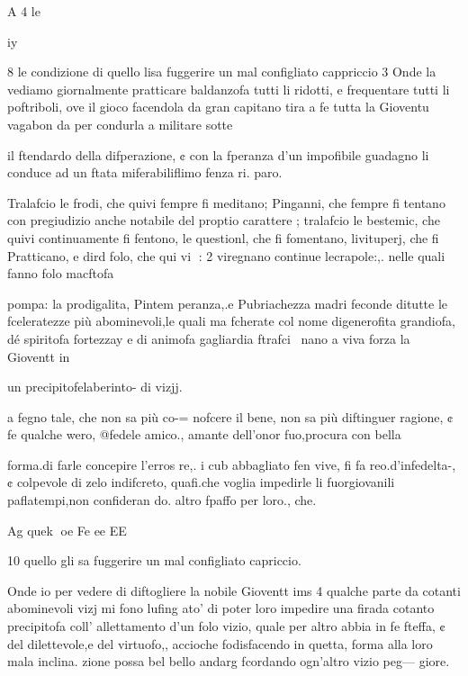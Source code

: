 \documentclass[11pt,a6paper]{article}
\begin{document}
A 4 le

iy

 

 

 

 
 

8
le condizione di quello lisa fuggerire un mal configliato cappriccio 3 Onde la vediamo giornalmente pratticare baldanzofa
tutti li ridotti, e frequentare
tutti li poftriboli, ove il gioco
facendola da gran capitano tira
a fe tutta la Gioventu vagabon
da per condurla a militare sotte

il ftendardo della difperazione,
¢ con la fperanza d’un impofibile guadagno li conduce ad un
ftata miferabiliflimo fenza ri.
paro.

Tralafcio le frodi, che quivi
fempre fi meditano; Pinganni,
che fempre fi tentano con pregiudizio anche notabile del proptio carattere ; tralafcio le bestemic, che quivi continuamente fi fentono, le questionl, che fi
fomentano, livituperj, che fi
Pratticano, e dird folo, che qui
vi
: 2
viregnano continue lecrapole:,.
nelle quali fanno folo macftofa

pompa: la prodigalita, Pintem
peranza,.e Pubriachezza madri
feconde ditutte le fceleratezze
più abominevoli,le quali ma
fcherate col nome digenerofita
grandiofa, dé spiritofa fortezzay
e di animofa gagliardia ftrafci~
nano a viva forza la Gioventt in

un precipitofelaberinto- di vizjj.

a fegno tale, che non sa più co-=
nofcere il bene, non sa più diftinguer ragione, ¢ fe qualche
wero, @fedele amico., amante
dell’onor fuo,procura con bella

forma.di farle concepire l’erros
re,. i cub abbagliato fen vive,
fi fa reo.d’infedelta-, ¢ colpevole di zelo indifcreto, quafi.che
voglia impedirle li fuorgiovanili paflatempi,non confideran
do. altro fpaffo per loro., che.

Ag quek
oe Fe ee EE

10
quello gli sa fuggerire un mal
configliato capriccio.

Onde io per vedere di diftogliere la nobile Gioventt ims 4
qualche parte da cotanti abominevoli vizj mi fono lufing ato’ di poter loro impedire una
firada cotanto precipitofa coll’
allettamento d’un folo vizio,
quale per altro abbia in fe fteffa,
¢ del dilettevole,e del virtuofo,,
accioche fodisfacendo in quetta,
forma alla loro mala inclina.
zione possa bel bello andarg
fcordando ogn’altro vizio peg—
giore.
\end{document}
